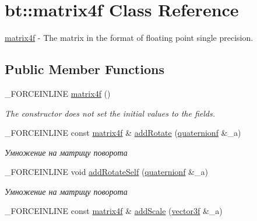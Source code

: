 \hypertarget{classbt_1_1matrix4f}{\section{bt\-:\-:matrix4f Class Reference}
\label{classbt_1_1matrix4f}
}


\hyperlink{classbt_1_1matrix4f}{matrix4f} -\/ The matrix in the format of floating point single precision.  


\subsection*{Public Member Functions}
\begin{DoxyCompactItemize}
\item 
\hypertarget{classbt_1_1matrix4f_a79d4905d661f5b6e86e35ed8b184e6f2}{\-\_\-\-F\-O\-R\-C\-E\-I\-N\-L\-I\-N\-E \hyperlink{classbt_1_1matrix4f_a79d4905d661f5b6e86e35ed8b184e6f2}{matrix4f} ()}\label{classbt_1_1matrix4f_a79d4905d661f5b6e86e35ed8b184e6f2}

\begin{DoxyCompactList}\small\item\em The constructor does not set the initial values to the fields. \end{DoxyCompactList}\item 
\hypertarget{classbt_1_1matrix4f_a96524e5ef6dbbc60ae458f43c3409c0b}{\-\_\-\-F\-O\-R\-C\-E\-I\-N\-L\-I\-N\-E const \hyperlink{classbt_1_1matrix4f}{matrix4f} \& \hyperlink{classbt_1_1matrix4f_a96524e5ef6dbbc60ae458f43c3409c0b}{add\-Rotate} (\hyperlink{classbt_1_1quaternionf}{quaternionf} \&\-\_\-a)}\label{classbt_1_1matrix4f_a96524e5ef6dbbc60ae458f43c3409c0b}

\begin{DoxyCompactList}\small\item\em Умножение на матрицу поворота \end{DoxyCompactList}\item 
\hypertarget{classbt_1_1matrix4f_aae9cd8d2c186d513430e4262374e0b0a}{\-\_\-\-F\-O\-R\-C\-E\-I\-N\-L\-I\-N\-E void \hyperlink{classbt_1_1matrix4f_aae9cd8d2c186d513430e4262374e0b0a}{add\-Rotate\-Self} (\hyperlink{classbt_1_1quaternionf}{quaternionf} \&\-\_\-a)}\label{classbt_1_1matrix4f_aae9cd8d2c186d513430e4262374e0b0a}

\begin{DoxyCompactList}\small\item\em Умножение на матрицу поворота \end{DoxyCompactList}\item 
\hypertarget{classbt_1_1matrix4f_a3ce07ddcfb26061b42303997f35f8cee}{\-\_\-\-F\-O\-R\-C\-E\-I\-N\-L\-I\-N\-E const \hyperlink{classbt_1_1matrix4f}{matrix4f} \& \hyperlink{classbt_1_1matrix4f_a3ce07ddcfb26061b42303997f35f8cee}{add\-Scale} (\hyperlink{classbt_1_1vector3f}{vector3f} \&\-\_\-a)}\label{classbt_1_1matrix4f_a3ce07ddcfb26061b42303997f35f8cee}


\end{DoxyCompactItemize}
